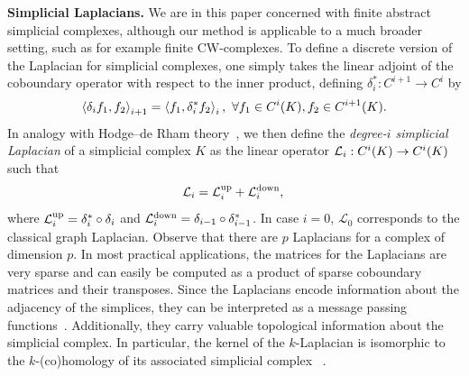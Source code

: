 \textbf{Simplicial Laplacians.} We are in this paper concerned with finite abstract simplicial complexes, although our method is applicable to a much broader setting, such as for example finite CW-complexes. 
To define a discrete version of the Laplacian for simplicial complexes, one simply takes the linear adjoint of the coboundary operator with respect to the inner product, defining $\delta_i^\ast:C^{i+1}\to C^i$ by
\begin{equation*}
  \left\langle \delta_i f_1 , f_2 \right\rangle_{i+1} =\left\langle f_1 , \delta_i^\ast f_2 \right\rangle_{i},\ \forall f_1\in C^{i}(K), f_2 \in C^{i+1}(K).
\end{equation*}
In analogy with Hodge--de Rham theory~\cite{madsen1997calculus}, we then define the \emph{degree-$i$ simplicial Laplacian} of a simplicial complex $K$ as the linear operator $\mathcal{L}_i:C^i(K)\to C^i(K)$ such that
\begin{equation*}
  \mathcal{L}_i = \mathcal{L}^{\text{up}}_i + \mathcal{L}^{\text{down}}_i,\\
\end{equation*}
where $\mathcal{L}^{\text{up}}_i =  \delta_{i}^\ast\circ\delta_{i}$ and $\mathcal{L}^{\text{down}}_i = \delta_{i-1}\circ\delta_{i-1}^\ast$. In case $i=0$, $\mathcal{L}_0$ corresponds to the classical graph Laplacian. Observe that there are $p$ Laplacians for a complex of dimension $p$. In most practical applications, the matrices for the Laplacians are very sparse and can easily be computed as a product of sparse coboundary matrices and their transposes. Since the Laplacians encode information about the adjacency of the simplices, they can be interpreted as a message passing functions~\cite{gilmer2017NeuralMP}. Additionally, they carry valuable topological information about the simplicial complex. In particular, the kernel of the $k$-Laplacian is isomorphic to the $k$-(co)homology of its associated simplicial complex ~\cite{eckmann1944,horak2013spectra}.
